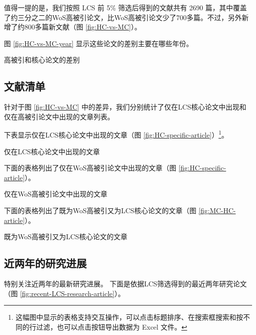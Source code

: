 \documentclass[]{ctexbook}
\begin{document}
值得一提的是，我们按照 LCS 前 5\% 筛选后得到的文献共有 2690 篇，其中覆盖了约三分之二的WoS高被引论文，比WoS高被引论文少了700多篇。不过，另外新增了约800多篇新文献（图 \ref{fig:HC-vs-MC}）。

图 \ref{fig:HC-vs-MC-year} 显示这些论文的差别主要在哪些年份。

\hypertarget{htmlwidget-c1b03c319efc94045e38}{}

\label{fig:HC-vs-MC-year}高被引和核心论文的差别

\hypertarget{ux6587ux732eux6e05ux5355}{%
\subsection{文献清单}\label{ux6587ux732eux6e05ux5355}}

针对于图 \ref{fig:HC-vs-MC} 中的差异，我们分别统计了仅在LCS核心论文中出现和仅在高被引论文中出现的文章列表。

下表显示仅在LCS核心论文中出现的文章（图 \ref{fig:HC-specific-article}）\footnote{这幅图中显示的表格支持交互操作，可以点击标题排序、在搜索框搜索和按不同的行过滤，也可以点击按钮导出数据为 Excel 文件。}。

\hypertarget{htmlwidget-124d37eb873897534361}{}

\label{fig:MC-specific-article}仅在LCS核心论文中出现的文章

下面的表格列出了仅在WoS高被引论文中出现的文章（图 \ref{fig:HC-specific-article}）。

\hypertarget{htmlwidget-ba053f7108f0259726ea}{}

\label{fig:HC-specific-article}仅在WoS高被引论文中出现的文章

下面的表格列出了既为WoS高被引又为LCS核心论文的文章（图 \ref{fig:MC-HC-article}）。

\hypertarget{htmlwidget-2a1a02bfa520dab52f45}{}

\label{fig:MC-HC-article}既为WoS高被引又为LCS核心论文的文章

\hypertarget{ux8fd1ux4e24ux5e74ux7684ux7814ux7a76ux8fdbux5c55}{%
\subsection{近两年的研究进展}\label{ux8fd1ux4e24ux5e74ux7684ux7814ux7a76ux8fdbux5c55}}

特别关注近两年的最新研究进展。
下面是依据LCS筛选得到的最近两年研究论文（图 \ref{fig:recent-LCS-research-article}）。

\hypertarget{htmlwidget-60859d1c4f2c7000d3f3}{}
\end{document}
